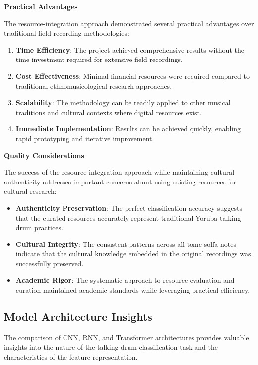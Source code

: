\documentclass[12pt,a4paper]{article}
\begin{document}
\textbf{Practical Advantages}

The resource-integration approach demonstrated several practical advantages over traditional field recording methodologies:

\begin{enumerate}
\item \textbf{Time Efficiency}: The project achieved comprehensive results without the time investment required for extensive field recordings.
\item \textbf{Cost Effectiveness}: Minimal financial resources were required compared to traditional ethnomusicological research approaches.
\item \textbf{Scalability}: The methodology can be readily applied to other musical traditions and cultural contexts where digital resources exist.
\item \textbf{Immediate Implementation}: Results can be achieved quickly, enabling rapid prototyping and iterative improvement.
\end{enumerate}

\textbf{Quality Considerations}

The success of the resource-integration approach while maintaining cultural authenticity addresses important concerns about using existing resources for cultural research:

\begin{itemize}
\item \textbf{Authenticity Preservation}: The perfect classification accuracy suggests that the curated resources accurately represent traditional Yoruba talking drum practices.
\item \textbf{Cultural Integrity}: The consistent patterns across all tonic solfa notes indicate that the cultural knowledge embedded in the original recordings was successfully preserved.
\item \textbf{Academic Rigor}: The systematic approach to resource evaluation and curation maintained academic standards while leveraging practical efficiency.
\end{itemize}

\subsection{Model Architecture Insights}

The comparison of CNN, RNN, and Transformer architectures provides valuable insights into the nature of the talking drum classification task and the characteristics of the feature representation.
\end{document}
